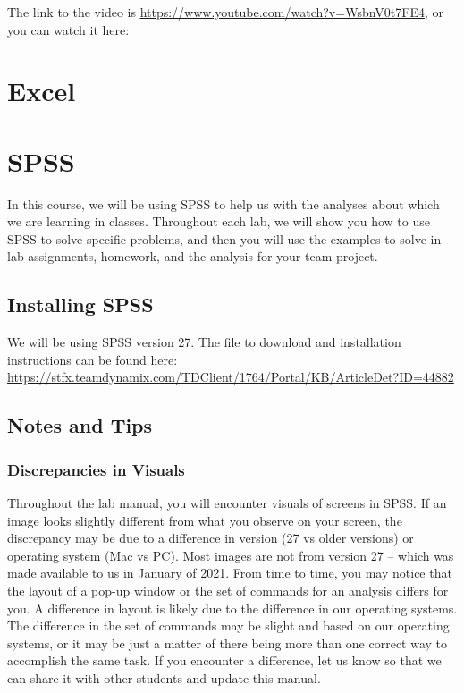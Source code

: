 \documentclass[]{book}
\begin{document}
The link to the video is
\url{https://www.youtube.com/watch?v=WsbnV0t7FE4}, or you can watch it
here:

\section{Excel}\label{excel}

\section{SPSS}\label{spss}

In this course, we will be using SPSS to help us with the analyses about
which we are learning in classes. Throughout each lab, we will show you
how to use SPSS to solve specific problems, and then you will use the
examples to solve in-lab assignments, homework, and the analysis for
your team project.

\subsection{Installing SPSS}\label{installing-spss}

We will be using SPSS version 27. The file to download and installation
instructions can be found here:
\url{https://stfx.teamdynamix.com/TDClient/1764/Portal/KB/ArticleDet?ID=44882}

\subsection{Notes and Tips}\label{notes-and-tips}

\subsubsection{Discrepancies in Visuals}\label{discrepancies-in-visuals}

Throughout the lab manual, you will encounter visuals of screens in
SPSS. If an image looks slightly different from what you observe on your
screen, the discrepancy may be due to a difference in version (27 vs
older versions) or operating system (Mac vs PC). Most images are not
from version 27 -- which was made available to us in January of 2021.
From time to time, you may notice that the layout of a pop-up window or
the set of commands for an analysis differs for you. A difference in
layout is likely due to the difference in our operating systems. The
difference in the set of commands may be slight and based on our
operating systems, or it may be just a matter of there being more than
one correct way to accomplish the same task. If you encounter a
difference, let us know so that we can share it with other students and
update this manual.
\end{document}
